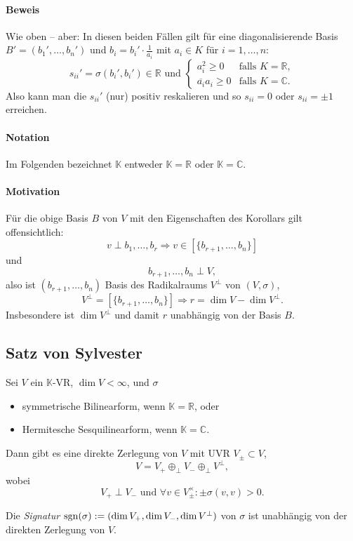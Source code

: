 \paragraph{Beweis}
	Wie oben -- aber:
	In diesen beiden Fällen gilt für eine diagonalisierende Basis $ B'=(b_1',\dots,b_n') $ und $ b_i = b_i'\cdot \frac{1}{a_i} $ mit $ a_i\in K $ für $ i=1,\dots,n $:
		\[ s_{ii}' = \sigma(b_i',b_i')\in \mathbb{R} \text{ und }
		\begin{cases}
			a_i^2 \geq 0 & \text{falls } K = \mathbb{R},\\
			\overline{a_i}a_i \geq 0 & \text{falls } K =\mathbb{C}.
		\end{cases} \]
	Also kann man die $ s_{ii}' $ (nur) positiv reskalieren und so $ s_{ii} = 0 $ oder $ s_{ii} = \pm 1 $ erreichen.
\paragraph{Notation}
	Im Folgenden bezeichnet $ \mathbb{K} $ entweder $ \mathbb{K} = \mathbb{R} $ oder $ \mathbb{K}=\mathbb{C} $.
\paragraph{Motivation}
	Für die obige Basis $ B $ von $ V $ mit den Eigenschaften des Korollars gilt offensichtlich:
		\[ v\perp b_1,\dots,b_r \Rightarrow v\in [\{b_{r+1},\dots,b_{n}\}] \]
	und
		\[ b_{r+1},\dots,b_n \perp V, \]
	also ist $ (b_{r+1},\dots,b_n) $ Basis des Radikalraums $ V^\perp $ von $ (V,\sigma) $,
		\[ V^\perp = [\{b_{r+1},\dots,b_n\} ] \Rightarrow r = \dim V-\dim V^\perp. \]
	Insbesondere ist $ \dim V^\perp $ und damit $ r $ unabhängig von der Basis $ B $.

\subsection{Satz von Sylvester}
\begin{Satz}	
	Sei $ V $ ein $ \mathbb{K} $-VR, $ \dim V <\infty $, und $ \sigma $
		\begin{itemize}
			\item symmetrische Bilinearform, wenn $ \mathbb{K}=\mathbb{R} $, oder
			\item Hermitesche Sesquilinearform, wenn $ \mathbb{K}=\mathbb{C} $.
		\end{itemize}
	Dann gibt es eine direkte Zerlegung von $ V $ mit UVR $ V_{\pm}\subset V $,
		\[ V= V_+ \oplus_\perp V_- \oplus_\perp V^\perp,  \]
	wobei
		\[ V_+ \perp V_- \text{ und } \forall v\in V^\times_\pm: \pm \sigma(v,v) > 0. \]
\end{Satz}
\begin{Definition}[Signatur]
	Die \emph{Signatur} $ \operatorname{sgn}(\sigma):= (\dim V_+,\dim V_-,\dim V^\perp) $ von $ \sigma $ ist unabhängig von der direkten Zerlegung von $ V $.
\end{Definition}

